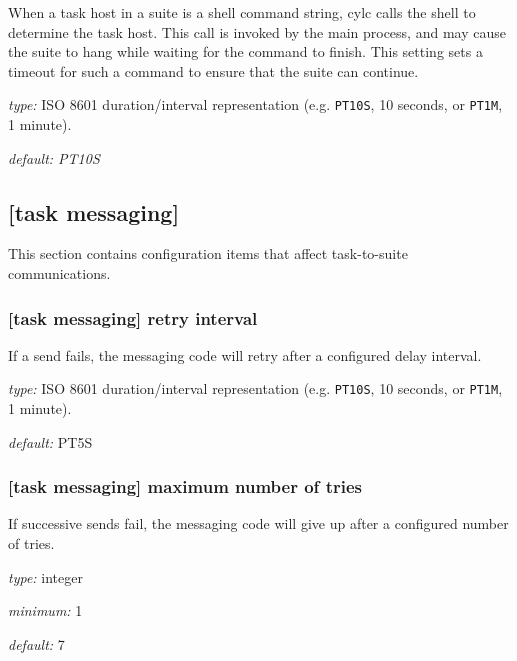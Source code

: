 When a task host in a suite is a shell command string, cylc calls the shell to
determine the task host. This call is invoked by the main process, and may
cause the suite to hang while waiting for the command to finish. This setting
sets a timeout for such a command to ensure that the suite can continue.

\begin{myitemize}
\item {\em type:} ISO 8601 duration/interval representation (e.g.
\lstinline=PT10S=, 10 seconds, or \lstinline=PT1M=, 1 minute).
\item {\em default: PT10S}
\end{myitemize}

\subsection{[task messaging]}

This section contains configuration items that affect task-to-suite
communications.

\subsubsection[retry interval]{[task messaging] \textrightarrow retry interval}

If a send fails, the messaging code will retry after a configured
delay interval.

\begin{myitemize}
\item {\em type:} ISO 8601 duration/interval representation (e.g.
\lstinline=PT10S=, 10 seconds, or \lstinline=PT1M=, 1 minute).
\item {\em default:} PT5S
\end{myitemize}

\subsubsection[maximum number of tries]{[task messaging] \textrightarrow maximum number of tries}

If successive sends fail, the messaging code will give up after a
configured number of tries.

\begin{myitemize}
\item {\em type:} integer
\item {\em minimum:} 1
\item {\em default:} 7
\end{myitemize}

